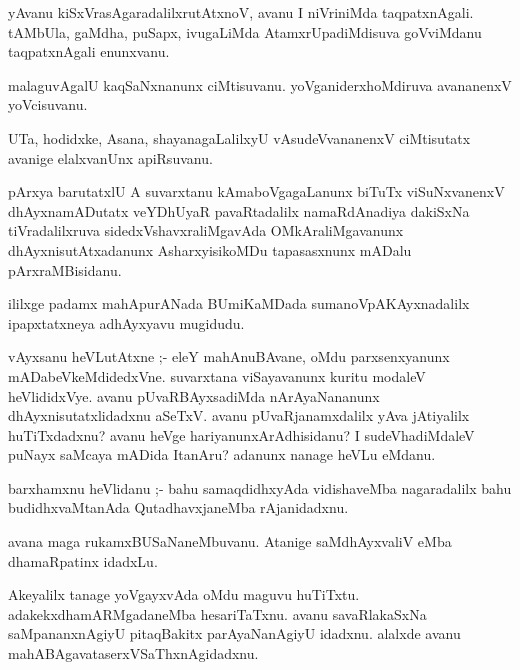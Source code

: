 \documentclass{article}
\begin{document}
\begin{mn}
yAvanu  kiSxVrasAgaradalilxrutAtxnoV, avanu I niVriniMda taqpatxnAgali. 
tAMbUla, gaMdha,  puSapx, ivugaLiMda AtamxrUpadiMdisuva goVviMdanu 
taqpatxnAgali enunxvanu.
\end{mn}

\begin{mn}
malaguvAgalU kaqSaNxnanunx ciMtisuvanu.  yoVganiderxhoMdiruva avananenxV yoVcisuvanu.
\end{mn}

\begin{mn}
UTa, hodidxke, Asana, shayanagaLalilxyU vAsudeVvananenxV ciMtisutatx  avanige  elalxvanUnx apiRsuvanu.
\end{mn}

\begin{mn}
pArxya barutatxlU A suvarxtanu kAmaboVgagaLanunx biTuTx viSuNxvanenxV  
dhAyxnamADutatx  veYDhUyaR pavaRtadalilx namaRdAnadiya dakiSxNa tiVradalilxruva  
sidedxVshavxraliMgavAda  OMkAraliMgavanunx dhAyxnisutAtxadanunx AsharxyisikoMDu 
tapasasxnunx mADalu pArxraMBisidanu.
\end{mn}

\begin{mn}
ililxge padamx mahApurANada BUmiKaMDada sumanoVpAKAyxnadalilx  ipapxtatxneya adhAyxyavu mugidudu.
\end{mn}



\begin{mn}
vAyxsanu heVLutAtxne ;- eleY mahAnuBAvane, oMdu parxsenxyanunx  mADabeVkeMdidedxVne. 
suvarxtana viSayavanunx kuritu modaleV heVlididxVye. avanu  pUvaRBAyxsadiMda 
nArAyaNananunx dhAyxnisutatxlidadxnu aSeTxV.  avanu pUvaRjanamxdalilx yAva 
jAtiyalilx huTiTxdadxnu? avanu heVge hariyanunxArAdhisidanu?  I sudeVhadiMdaleV 
puNayx saMcaya  mADida ItanAru?  adanunx nanage heVLu eMdanu. 
\end{mn}

\begin{mn}
barxhamxnu heVlidanu ;- bahu samaqdidhxyAda  vidishaveMba nagaradalilx  
bahu budidhxvaMtanAda QutadhavxjaneMba rAjanidadxnu.
\end{mn}

\begin{mn}
avana maga rukamxBUSaNaneMbuvanu.  Atanige saMdhAyxvaliV eMba dhamaRpatinx idadxLu.
\end{mn}

\begin{mn}
Akeyalilx tanage yoVgayxvAda oMdu maguvu huTiTxtu. adakekxdhamARMgadaneMba 
hesariTaTxnu.  avanu savaRlakaSxNa saMpananxnAgiyU pitaqBakitx parAyaNanAgiyU 
idadxnu.  alalxde avanu mahABAgavataserxVSaThxnAgidadxnu.
\end{mn}
\end{document}
